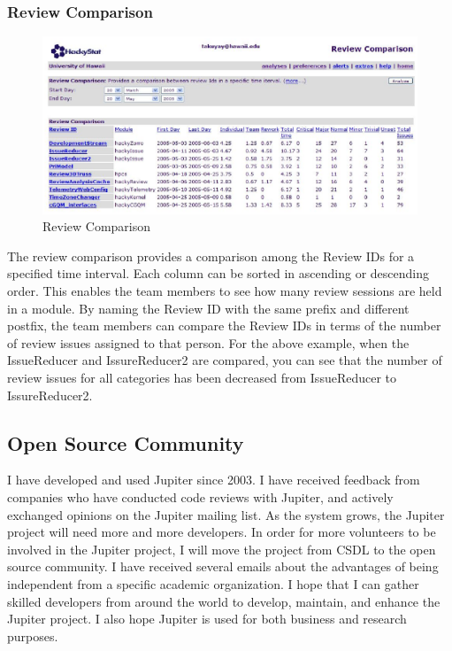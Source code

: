 \subsubsection{Review Comparison}
\label{subsec:review-comparison}

\begin{figure}[htbp]
  \centering
  \includegraphics{images/fig6-2.eps}
  \caption{Review Comparison}
  \label{fig6-2}
\end{figure}

The review comparison provides a comparison among the Review IDs for a specified time interval. Each column can be sorted in ascending or descending order. This enables the team members to see how many review sessions are held in a module. By naming the Review ID with the same prefix and different postfix, the team members can compare the Review IDs in terms of the number of review issues assigned to that person. For the above example, when the IssueReducer and IssureReducer2 are compared, you can see that the number of review issues for all categories has been decreased from IssueReducer to IssureReducer2.

\subsection{Open Source Community}
\label{subsec:open-source-community}

I have developed and used Jupiter since 2003. I have received feedback from companies who have conducted code reviews with Jupiter, and actively exchanged opinions on the Jupiter mailing list. As the system grows, the Jupiter project will need more and more developers. In order for more volunteers to be involved in the Jupiter project, I will move the project from CSDL to the open source community. I have received several emails about the advantages of being independent from a specific academic organization. I hope that I can gather skilled developers from around the world to develop, maintain, and enhance the Jupiter project. I also hope Jupiter is used for both business and research purposes.

